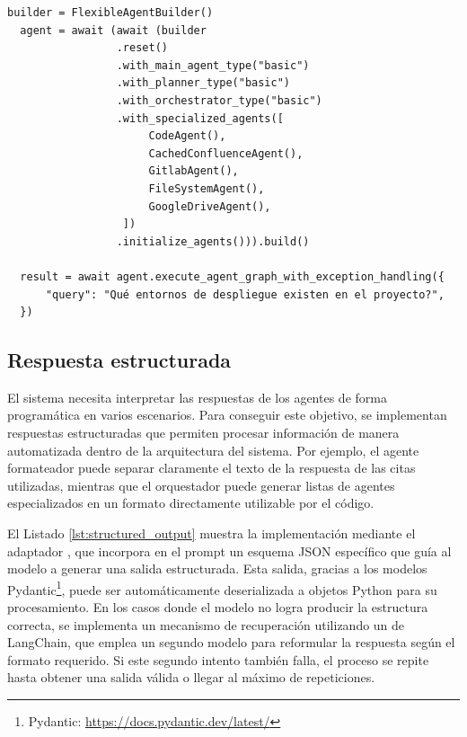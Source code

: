 \begin{lstlisting}[caption={Instanciación y ejecución del sistema mínimo con el patrón Builder},label={lst:builder}]
  builder = FlexibleAgentBuilder()
  agent = await (await (builder
                 .reset()
                 .with_main_agent_type("basic")
                 .with_planner_type("basic")
                 .with_orchestrator_type("basic")
                 .with_specialized_agents([
                      CodeAgent(),
                      CachedConfluenceAgent(),
                      GitlabAgent(),
                      FileSystemAgent(),
                      GoogleDriveAgent(),
                  ])
                 .initialize_agents())).build()

  result = await agent.execute_agent_graph_with_exception_handling({
      "query": "Qué entornos de despliegue existen en el proyecto?",
  })
\end{lstlisting}

\subsection{Respuesta estructurada}
El sistema necesita interpretar las respuestas de los agentes de forma programática en varios escenarios. Para conseguir este objetivo, se implementan respuestas estructuradas que permiten procesar información de manera automatizada dentro de la arquitectura del sistema. Por ejemplo, el agente formateador puede separar claramente el texto de la respuesta de las citas utilizadas, mientras que el orquestador puede generar listas de agentes especializados en un formato directamente utilizable por el código.

El Listado \ref{lst:structured_output} muestra la implementación mediante el adaptador , que incorpora en el prompt un esquema JSON específico que guía al modelo a generar una salida estructurada. Esta salida, gracias a los modelos Pydantic\footnote{Pydantic: \url{https://docs.pydantic.dev/latest/}}, puede ser automáticamente deserializada a objetos Python para su procesamiento. En los casos donde el modelo no logra producir la estructura correcta, se implementa un mecanismo de recuperación utilizando un  de LangChain, que emplea un segundo modelo para reformular la respuesta según el formato requerido. Si este segundo intento también falla, el proceso se repite hasta obtener una salida válida o llegar al máximo de repeticiones.

